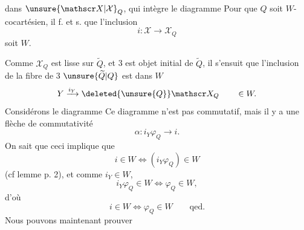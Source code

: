 
dans $\unsure{\mathscr X|\mathcal X}_Q$, qui intègre le diagramme
Pour que $Q$ soit $W$-cocartésien, il f. et s. que l'inclusion
\[
i:\mathscr X\longrightarrow\mathscr X_Q
\]
soit  $W$.

Comme $\mathscr X_Q$ est lisse sur $\widetilde Q$, et 3 est objet initial de $\widetilde Q$, il s'ensuit que l'inclusion de la fibre de  $3$  $\unsure{\widetilde Q|Q}$ est dans $W$
\[
 Y\xrightarrow{i_Y}\deleted{\unsure{Q}}\mathscr X_Q\qquad\in W.
\]
Considérons  le diagramme
Ce diagramme n'est pas commutatif, mais il y a une flèche de commutativité
\[
 \alpha:i_Y\varphi_Q\longrightarrow i.
\]
On sait que ceci implique que 
\[
 i\in W \Longleftrightarrow (i_Y\varphi_Q)\in W
\]
(cf lemme p. 2), et comme $i_Y\in W$, 
\[
 i_Y\varphi_Q\in W\Longleftrightarrow\varphi_Q\in W,
\]
d'où
\[
 i\in W\Longleftrightarrow\varphi_Q\in W\qquad \text{qed.}
\]
Nous pouvons maintenant prouver


